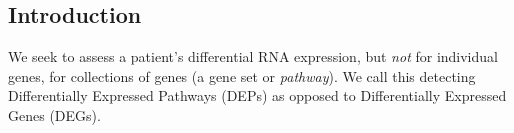 \documentclass[a0,portrait]{a0poster}
\begin{document}
\begin{multicols}{3} %

 
  

\color{Black} %
\section{Introduction}

We seek to assess a patient's differential RNA expression, but \textit{not} for individual genes, for collections of genes (a gene set or \textit{pathway}). We call this detecting Differentially Expressed Pathways (DEPs) as opposed to Differentially Expressed Genes (DEGs). 


\end{multicols}
\end{document}
